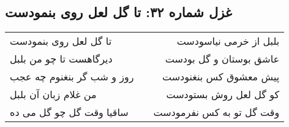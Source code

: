 \begin{center}
\section*{غزل شماره ۳۲: تا گل لعل روی بنمودست}
\label{sec:032}
\begin{longtable}{l p{0.5cm} r}
تا گل لعل روی بنمودست
&&
بلبل از خرمی نیاسودست
\\
دیرگاهست تا چو من بلبل
&&
عاشق بوستان و گل بودست
\\
روز و شب گر بنغنوم چه عجب
&&
پیش معشوق کس بنغنودست
\\
من غلام زبان آن بلبل
&&
کو گل لعل روش بستودست
\\
ساقیا وقت گل چو گل می ده
&&
وقت گل تو به کس نفرمودست
\\
\end{longtable}
\end{center}
